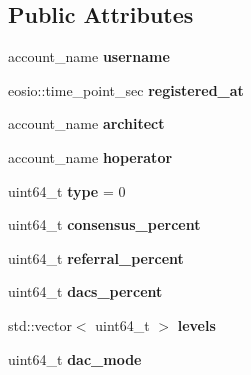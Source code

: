 \subsection*{Public Attributes}
\begin{DoxyCompactItemize}
\item 
\mbox{\label{structeosio_1_1hosts_af8c52fcab31ea74857dd0136952d9d44}} 
account\+\_\+name {\bfseries username}
\item 
\mbox{\label{structeosio_1_1hosts_a7d5865f1bba5f623d3c3aa04498adf7c}} 
eosio\+::time\+\_\+point\+\_\+sec {\bfseries registered\+\_\+at}
\item 
\mbox{\label{structeosio_1_1hosts_af4a9ab7d0bd3baa14eb0015edf13c73b}} 
account\+\_\+name {\bfseries architect}
\item 
\mbox{\label{structeosio_1_1hosts_a2ee11fbdc565453aeef46d7f45d7e7ac}} 
account\+\_\+name {\bfseries hoperator}
\item 
\mbox{\label{structeosio_1_1hosts_af1b121cebae5123f52f61b19ca4bc78b}} 
uint64\+\_\+t {\bfseries type} = 0
\item 
\mbox{\label{structeosio_1_1hosts_a5330eba83a4c5a9f2d4624b0fae64317}} 
uint64\+\_\+t {\bfseries consensus\+\_\+percent}
\item 
\mbox{\label{structeosio_1_1hosts_a891689051a65470a3ac0c05415b9535e}} 
uint64\+\_\+t {\bfseries referral\+\_\+percent}
\item 
\mbox{\label{structeosio_1_1hosts_a969800c9abe13d4eeac6ded634bc3e59}} 
uint64\+\_\+t {\bfseries dacs\+\_\+percent}
\item 
\mbox{\label{structeosio_1_1hosts_a8e9583571dfcd3ddfc5faa6847866d24}} 
std\+::vector$<$ uint64\+\_\+t $>$ {\bfseries levels}
\item 
\mbox{\label{structeosio_1_1hosts_a257be2d2f298adb8963a24caaea30a59}} 
uint64\+\_\+t {\bfseries dac\+\_\+mode}
\item 

\end{DoxyCompactItemize}
